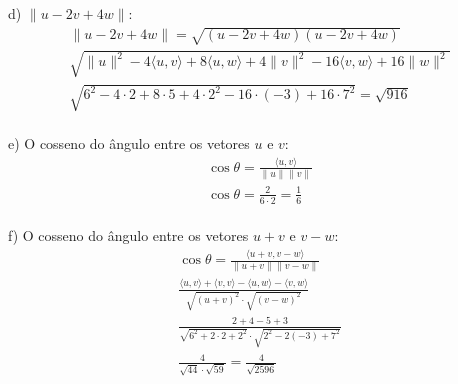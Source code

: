d) $\|u - 2v + 4w\|$:
\\
\[
    \begin{split}
        \|u - 2v + 4w\| = \sqrt{(u - 2v + 4w)(u - 2v + 4w)}\\
        \sqrt{\|u\|^2-4\langle u,v\rangle + 8\langle u,w\rangle + 4\|v\|^2 - 16\langle v,w\rangle + 16\|w\|^2}\\
        \sqrt{6^2-4\cdot2+8\cdot5+4\cdot2^2-16\cdot(-3)+16\cdot7^2} = \sqrt{916}
    \end{split}
\]
\\

e) O cosseno do ângulo entre os vetores $u$ e $v$:
\\
\[
    \begin{split}
        \cos\theta = \frac{\langle u,v\rangle}{\|u\|\|v\|}\\
        \cos\theta = \frac{2}{6\cdot2} = \frac{1}{6}
    \end{split}
\]
\\

f) O cosseno do ângulo entre os vetores $u + v$ e $v - w$:
\\
\[
    \begin{split}
        \cos\theta = \frac{\langle u + v,v - w\rangle}{\|u + v\|\|v - w\|}\\
        \frac{\langle u, v\rangle + \langle v,v\rangle - \langle u,w\rangle-\langle v,w\rangle}{\sqrt{(u+v)^2}\cdot \sqrt{(v-w)^2}}\\
        \frac{2+4-5+3}{\sqrt{6^2+2\cdot 2+2^2}\cdot \sqrt{2^2-2(-3)+7^2}}\\
        \frac{4}{\sqrt{44}\cdot \sqrt{59}} = \frac{4}{\sqrt{2596}}
    \end{split}
\]
\\